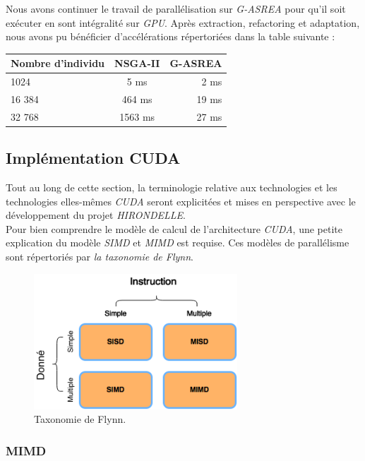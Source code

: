 \documentclass[french, 11pt]{memoir}
\begin{document}
Nous avons continuer le travail de parallélisation sur \textit{G-ASREA} pour
qu'il soit exécuter en sont intégralité sur \textit{GPU}. Après extraction,
refactoring et adaptation, nous avons pu bénéficier d'accélérations
répertoriées dans la table suivante :

\begin{center}
	\begin{tabular}{ |l| c| r| }
		\hline
		Nombre d'individu & NSGA-II & G-ASREA \\
		\hline
		1024 & 5 ms & 2 ms \\
		16 384 & 464 ms & 19 ms\\
		32 768  & 1563 ms& 27 ms\\
		\hline
	\end{tabular}
\end{center}

\subsection{Implémentation CUDA}\label{impluxe9mentation-cuda}

Tout au long de cette section, la terminologie relative aux technologies
et les technologies elles-mêmes \emph{CUDA} seront explicitées et mises
en perspective avec le développement du projet \emph{HIRONDELLE}.\\
Pour
bien comprendre le modèle de calcul de l'architecture \emph{CUDA}, une
petite explication du modèle \emph{SIMD} et \emph{MIMD} est requise. Ces
modèles de parallélisme sont répertoriés par \textit{la taxonomie de Flynn}.

\begin{figure}[htbp]
	\begin{center}
		\includegraphics[width=3in]{img/FLYNN.png}
		\caption{Taxonomie de Flynn.}
	\end{center}
\end{figure}

\subsubsection{MIMD}\label{mimd}
\end{document}
